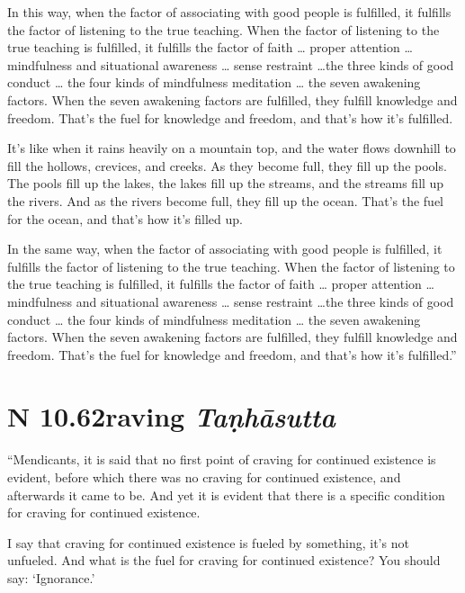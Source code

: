 \documentclass[12pt,openany]{book}%
\newcommand*{\suttatitleacronym}[1]{\smaller[2]{#1}\vspace*{.3em}}
\newcommand*{\suttatitletranslation}[1]{\linebreak{#1}}
\newcommand*{\suttatitleroot}[1]{\linebreak\smaller[2]\itshape{#1}}
\newcommand*{\tocacronym}[1]{\hspace*{-3.3em}{#1}\quad}
\newcommand*{\toctranslation}[1]{#1}
\newcommand*{\tocroot}[1]{(\textit{#1})}
\begin{document}
In this way, when the factor of associating with good people is fulfilled, it fulfills the factor of listening to the true teaching. When the factor of listening to the true teaching is fulfilled, it fulfills the factor of faith … proper attention … mindfulness and situational awareness … sense restraint …the three kinds of good conduct … the four kinds of mindfulness meditation … the seven awakening factors. When the seven awakening factors are fulfilled, they fulfill knowledge and freedom. That’s the fuel for knowledge and freedom, and that’s how it’s fulfilled. 

It’s like when it rains heavily on a mountain top, and the water flows downhill to fill the hollows, crevices, and creeks. As they become full, they fill up the pools. The pools fill up the lakes, the lakes fill up the streams, and the streams fill up the rivers. And as the rivers become full, they fill up the ocean. That’s the fuel for the ocean, and that’s how it’s filled up. 

In the same way, when the factor of associating with good people is fulfilled, it fulfills the factor of listening to the true teaching. When the factor of listening to the true teaching is fulfilled, it fulfills the factor of faith … proper attention … mindfulness and situational awareness … sense restraint …the three kinds of good conduct … the four kinds of mindfulness meditation … the seven awakening factors. When the seven awakening factors are fulfilled, they fulfill knowledge and freedom. That’s the fuel for knowledge and freedom, and that’s how it’s fulfilled.” 

%
\section*{{\suttatitleacronym AN 10.62}{\suttatitletranslation Craving }{\suttatitleroot Taṇhāsutta}}
\addcontentsline{toc}{section}{\tocacronym{AN 10.62} \toctranslation{Craving } \tocroot{Taṇhāsutta}}

“Mendicants, it is said that no first point of craving for continued existence is evident, before which there was no craving for continued existence, and afterwards it came to be. And yet it is evident that there is a specific condition for craving for continued existence. 

I say that craving for continued existence is fueled by something, it’s not unfueled. And what is the fuel for craving for continued existence? You should say: ‘Ignorance.’ 
\end{document}
